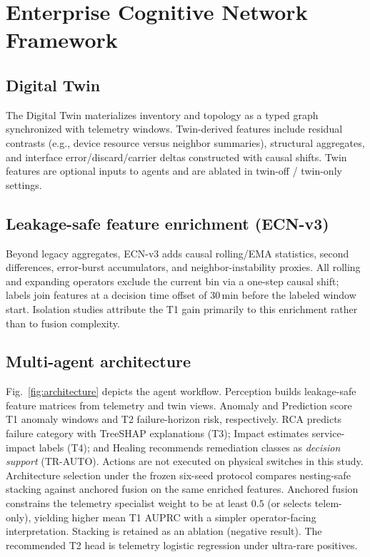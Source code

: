\section{Enterprise Cognitive Network Framework}
\label{sec:framework}

\subsection{Digital Twin}
The Digital Twin materializes inventory and topology as a typed graph synchronized with telemetry windows. Twin-derived features include residual contrasts (e.g., device resource versus neighbor summaries), structural aggregates, and interface error/discard/carrier deltas constructed with causal shifts. Twin features are optional inputs to agents and are ablated in twin-off / twin-only settings.

\subsection{Leakage-safe feature enrichment (ECN-v3)}
Beyond legacy aggregates, ECN-v3 adds causal rolling/EMA statistics, second differences, error-burst accumulators, and neighbor-instability proxies. All rolling and expanding operators exclude the current bin via a one-step causal shift; labels join features at a decision time offset of $30\,\mathrm{min}$ before the labeled window start. Isolation studies attribute the T1 gain primarily to this enrichment rather than to fusion complexity.

\subsection{Multi-agent architecture}
Fig.~\ref{fig:architecture} depicts the agent workflow. Perception builds leakage-safe feature matrices from telemetry and twin views. Anomaly and Prediction score T1 anomaly windows and T2 failure-horizon risk, respectively. RCA predicts failure category with TreeSHAP explanations (T3); Impact estimates service-impact labels (T4); and Healing recommends remediation classes as \emph{decision support} (TR-AUTO). Actions are not executed on physical switches in this study.
Architecture selection under the frozen six-seed protocol compares nesting-safe stacking against anchored fusion on the same enriched features. Anchored fusion constrains the telemetry specialist weight to be at least $0.5$ (or selects telem-only), yielding higher mean T1 AUPRC with a simpler operator-facing interpretation. Stacking is retained as an ablation (negative result). The recommended T2 head is telemetry logistic regression under ultra-rare positives.

